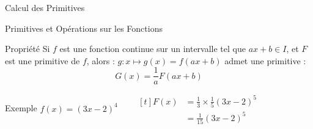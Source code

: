\documentclass{cours}
\begin{document}
\begin{Gpartie}{Calcul des Primitives}
\begin{Spartie}{Primitives et Opérations sur les Fonctions}
            \begin{SSpartie}{Propriété} 
                Si $f$ est une fonction continue sur un intervalle tel que $ax+b\in I$, et $F$ est une primitive de $f$, alors : $g:x\mapsto g(x)=f(ax+b)$ admet une primitive :
                \[G(x)=\frac{1}{a}F(ax+b)\]
                \begin{SSSpartie}{Exemple} 
                    $f(x)=(3x-2)^4\qquad
                    \begin{aligned}[t]
                        F(x)&=\tfrac{1}{3}\times\tfrac{1}{5}(3x-2)^5 \\
                        &=\tfrac{1}{15}(3x-2)^5
                    \end{aligned}$
                \end{SSSpartie}
            \end{SSpartie}
        \end{Spartie}
    \end{Gpartie}
\end{document}
